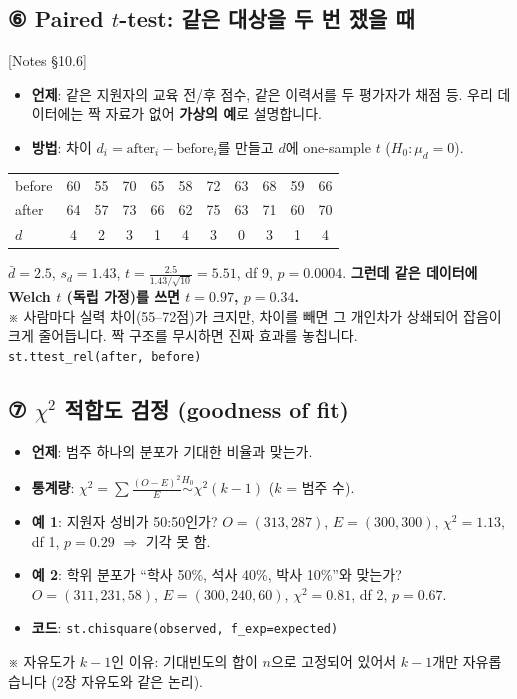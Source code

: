 \documentclass[11pt,a4paper]{article}
\newcommand{\code}[1]{\texttt{#1}}
\newcommand{\nref}[1]{{\footnotesize\textsf{\color{blue!55!black}[Notes #1]}}}
\newcommand{\aside}[1]{{\footnotesize\color{black!65}#1}}
\begin{document}
\subsection*{⑥ Paired $t$-test: 같은 대상을 두 번 쟀을 때} \nref{§10.6}
\begin{itemize}
\item \textbf{언제}: 같은 지원자의 교육 전/후 점수, 같은 이력서를 두 평가자가 채점 등. 우리 데이터에는 짝 자료가 없어 \textbf{가상의 예}로 설명합니다.
\item \textbf{방법}: 차이 $d_i=\text{after}_i-\text{before}_i$를 만들고 $d$에 one-sample $t$ ($H_0:\mu_d=0$).
\end{itemize}
\begin{center}\small
\begin{tabular}{@{}l *{10}{c}@{}}
\toprule
before & 60 & 55 & 70 & 65 & 58 & 72 & 63 & 68 & 59 & 66 \\
after & 64 & 57 & 73 & 66 & 62 & 75 & 63 & 71 & 60 & 70 \\
$d$ & 4 & 2 & 3 & 1 & 4 & 3 & 0 & 3 & 1 & 4 \\
\bottomrule
\end{tabular}
\end{center}
$\bar d=2.5$, $s_d=1.43$, $t=\frac{2.5}{1.43/\sqrt{10}}=5.51$, df 9, $p=0.0004$. \textbf{그런데 같은 데이터에 Welch $t$ (독립 가정)를 쓰면 $t=0.97$, $p=0.34$.}\\
\aside{※ 사람마다 실력 차이(55–72점)가 크지만, 차이를 빼면 그 개인차가 상쇄되어 잡음이 크게 줄어듭니다. 짝 구조를 무시하면 진짜 효과를 놓칩니다.}\\
\code{st.ttest\_rel(after, before)}

\subsection*{⑦ $\chi^2$ 적합도 검정 (goodness of fit)}
\begin{itemize}
\item \textbf{언제}: 범주 하나의 분포가 기대한 비율과 맞는가.
\item \textbf{통계량}: $\chi^2=\sum\frac{(O-E)^2}{E}\overset{H_0}\sim\chi^2(k-1)$ ($k$ = 범주 수).
\item \textbf{예 1}: 지원자 성비가 50:50인가? $O=(313,287)$, $E=(300,300)$, $\chi^2=1.13$, df 1, $p=0.29$ $\Rightarrow$ 기각 못 함.
\item \textbf{예 2}: 학위 분포가 ``학사 50\%, 석사 40\%, 박사 10\%''와 맞는가? $O=(311,231,58)$, $E=(300,240,60)$, $\chi^2=0.81$, df 2, $p=0.67$.
\item \textbf{코드}: \code{st.chisquare(observed, f\_exp=expected)}
\end{itemize}
\aside{※ 자유도가 $k-1$인 이유: 기대빈도의 합이 $n$으로 고정되어 있어서 $k-1$개만 자유롭습니다 (2장 자유도와 같은 논리).}
\end{document}
